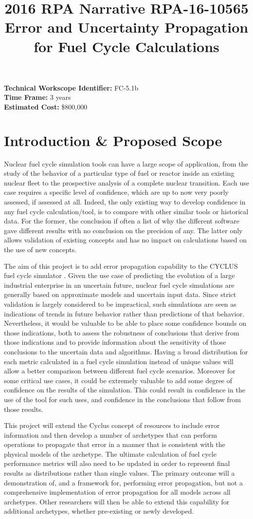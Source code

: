 \documentclass[dvips,12pt]{article}
\title{2016 RPA Narrative RPA-16-10565\\
Error and Uncertainty Propagation for Fuel Cycle Calculations}
\begin{document}
\noindent\textbf{Technical Workscope Identifier:} FC-5.1b\\
\textbf{Time Frame:} 3 years\\
\textbf{Estimated Cost:} \$800,000


\section{Introduction \& Proposed Scope}
Nuclear fuel cycle simulation tools can have a large
scope of application, from the study of the
behavior of a particular type of fuel or reactor inside an
existing nuclear fleet to the prospective analysis
of a complete nuclear transition. 
Each use case
requires a specific level
of confidence, which are up to now very
poorly assessed, if assessed at all.
Indeed, the only existing way to develop confidence in
any fuel cycle calculation/tool, is to compare
with other similar tools or historical
data.  For the former, the conclusion if often 
a list of why the different software gave
different results with no conclusion on the
precision of any.  The latter only allows
validation of existing concepts and has no impact
on calculations based on the use of new
concepts.

The aim of this project is to add error
propagation capability to the CYCLUS fuel cycle
simulator \cite{CYCLUS}. Given the use case of predicting the
evolution of a large industrial enterprise in an
uncertain future, nuclear fuel cycle simulations
are generally based on approximate models and
uncertain input data.  Since strict validation is largely
considered to be impractical, such simulations are
seen as indications of trends in future behavior rather than
predictions of that behavior. Nevertheless, it
would be valuable to be able to place some
confidence bounds on those indications, both to
assess the robustness of conclusions that derive
from those indications and to provide information
about the sensitivity of those conclusions to the
uncertain data and algorithms.  Having a broad
distribution for each metric calculated in a fuel
cycle simulation instead of unique values will
allow a better comparison between different fuel
cycle scenarios.  Moreover for some critical
use cases, it could be extremely valuable to add
some degree of confidence on the results of the simulation.
This could result in confidence in the use of the tool for
such uses, and confidence in the conclusions that follow
from those results.

This project
will extend the Cyclus concept of resources to
include error information and then develop a
number of archetypes that can perform operations
to propagate that error in a manner that is 
consistent with the physical models of the 
archetype.
The ultimate calculation of fuel cycle performance
metrics will also need to be updated in order to
represent final results as distributions rather
than single values.  The primary outcome will
a demonstration of, and a
framework for, performing error propagation,
but not a comprehensive implementation of error
propagation for all models across all archetypes.
Other researchers will then be able to extend
this capability for additional archetypes, 
whether pre-existing or newly developed.
\end{document}
